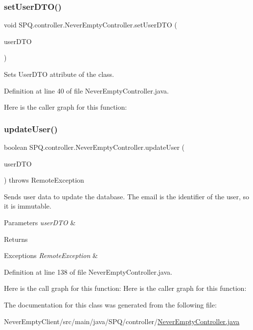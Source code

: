 \subsubsection{\texorpdfstring{set\+User\+D\+T\+O()}{setUserDTO()}}
{\footnotesize\ttfamily void S\+P\+Q.\+controller.\+Never\+Empty\+Controller.\+set\+User\+D\+TO (\begin{DoxyParamCaption}\item[{\mbox{\hyperlink{class_s_p_q_1_1dto_1_1_user_d_t_o}{User\+D\+TO}}}]{user\+D\+TO }\end{DoxyParamCaption})}

Sets User\+D\+TO attribute of the class. 

Definition at line 40 of file Never\+Empty\+Controller.\+java.

Here is the caller graph for this function\+:
\mbox{\label{class_s_p_q_1_1controller_1_1_never_empty_controller_abac74fe36817d476abdd20d19df2092b}} 
\subsubsection{\texorpdfstring{update\+User()}{updateUser()}}
{\footnotesize\ttfamily boolean S\+P\+Q.\+controller.\+Never\+Empty\+Controller.\+update\+User (\begin{DoxyParamCaption}\item[{\mbox{\hyperlink{class_s_p_q_1_1dto_1_1_user_d_t_o}{User\+D\+TO}}}]{user\+D\+TO }\end{DoxyParamCaption}) throws Remote\+Exception}

Sends user data to update the database. The email is the identifier of the user, so it is immutable. 
\begin{DoxyParams}{Parameters}
{\em user\+D\+TO} & \\
\hline
\end{DoxyParams}
\begin{DoxyReturn}{Returns}

\end{DoxyReturn}

\begin{DoxyExceptions}{Exceptions}
{\em Remote\+Exception} & \\
\hline
\end{DoxyExceptions}


Definition at line 138 of file Never\+Empty\+Controller.\+java.

Here is the call graph for this function\+:
Here is the caller graph for this function\+:


The documentation for this class was generated from the following file\+:\begin{DoxyCompactItemize}
\item 
Never\+Empty\+Client/src/main/java/\+S\+P\+Q/controller/\mbox{\hyperlink{_never_empty_controller_8java}{Never\+Empty\+Controller.\+java}}\end{DoxyCompactItemize}
